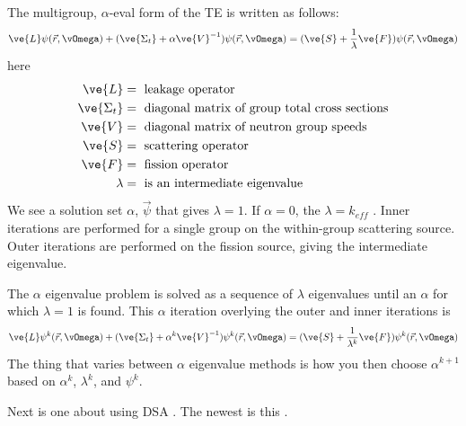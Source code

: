 \documentclass[12pt,twoside]{article}
\begin{document}
The multigroup, $\alpha$-eval form of the TE is written as follows:
\[
\ve{L} \psi(\vec{r}, \vOmega) + (\ve{\Sigma_t} + \alpha \ve{V}^{-1}) \psi(\vec{r}, \vOmega) = (\ve{S} + \frac{1}{\lambda}\ve{F}) \psi(\vec{r}, \vOmega)
\]
here
\begin{align*}
\ve{L} &=\text{ leakage operator}\\
\ve{\Sigma_t} &=\text{ diagonal matrix of group total cross sections}\\
\ve{V} &=\text{ diagonal matrix of neutron group speeds}\\
\ve{S} &=\text{ scattering operator}\\
\ve{F} &=\text{ fission operator}\\
\lambda &=\text{ is an intermediate eigenvalue}
\end{align*}
We see a solution set $\alpha$, $\vec{\psi}$ that gives $\lambda = 1$. 
If $\alpha=0$, the $\lambda = k_{eff}$ .
Inner iterations are performed for a single group on the within-group scattering source.
Outer iterations are performed on the fission source, giving the intermediate eigenvalue.

The $\alpha$ eigenvalue problem is solved as a sequence of $\lambda$ eigenvalues until an $\alpha$ for which $\lambda = 1$ is found. 
This $\alpha$ iteration overlying the outer and inner iterations is
\[
\ve{L} \psi^k(\vec{r}, \vOmega) + (\ve{\Sigma_t} + \alpha^k \ve{V}^{-1}) \psi^k(\vec{r}, \vOmega) = (\ve{S} + \frac{1}{\lambda^k}\ve{F}) \psi^k(\vec{r}, \vOmega)
\]
The thing that varies between $\alpha$ eigenvalue methods is how you then choose $\alpha^{k+1}$ based on $\alpha^k$, $\lambda^k$, and $\psi^k$.


Next is one about using DSA \cite{Dahl2006}. The newest is this \cite{Fichtl}.




\end{document}
